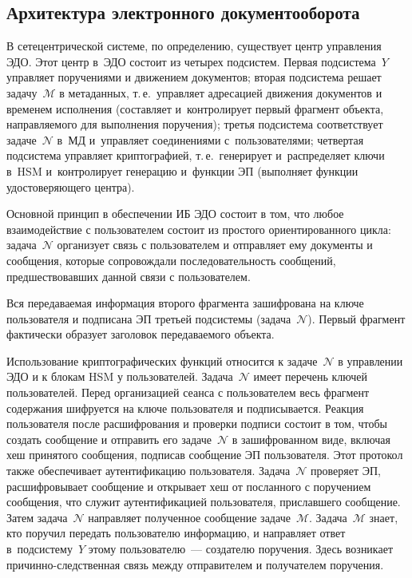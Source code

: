 \begin{multicols}{2}
\section{Архитектура электронного документооборота}

   В сетецентрической системе, по определению, существует центр управления 
ЭДО. Этот центр в~ЭДО состоит из четырех подсистем. Первая подсистема~$Y$ 
управляет поручениями и движением документов; вторая подсистема решает 
задачу~$\mathcal{M}$ в метаданных, т.\,е.\ управляет адресацией движения 
документов и временем исполнения (составляет и~контролирует первый фрагмент 
объекта, направляемого для выполнения поручения); третья под\-сис\-те\-ма 
соответствует задаче~$\mathcal{N}$ в~МД и~управ\-ля\-ет соединениями 
с~пользователями; четвертая под\-сис\-те\-ма управ\-ля\-ет криптографией, т.\,е.\ генерирует 
и~распределяет ключи в~HSM и~контролирует генерацию и~функции ЭП 
(выполняет функции удосто\-ве\-ря\-юще\-го центра). 
  
  Основной принцип в обеспечении ИБ ЭДО состоит в том, что любое 
взаимодействие с пользователем состоит из простого ориентированного цикла:
  задача~$\mathcal{N}$ организует связь с пользователем и отправляет ему 
документы и сообщения, которые сопровождали последовательность сообщений, 
предшествовавших данной связи с пользователем. 

Вся передаваемая информация 
второго фрагмента зашифрована на ключе пользователя и подписана ЭП третьей 
подсистемы (задача~$\mathcal{N}$). Первый фрагмент фактически образует 
заголовок передаваемого объекта. 
  
  Использование криптографических функций относится к задаче~$\mathcal{N}$ 
в управлении ЭДО и к блокам HSM у пользователей. Задача~$\mathcal{N}$ имеет 
перечень ключей пользователей. Перед организацией сеанса с пользователем весь 
фрагмент содержания шифруется на ключе пользователя и подписывается. 
Реакция пользователя после расшифрования и проверки подписи состоит в том, 
чтобы создать сообщение и отправить его задаче~$\mathcal{N}$ в зашифрованном 
виде, включая хеш принятого сообщения, подписав сообщение ЭП пользователя. 
Этот протокол также обеспечивает аутентификацию пользователя. 
Задача~$\mathcal{N}$ проверяет ЭП, расшифровывает сообщение и открывает 
хеш от посланного с поручением сообщения, что служит аутентификацией 
пользователя, приславшего сообщение. Затем задача~$\mathcal{N}$ направляет 
полученное сообщение задаче~$\mathcal{M}$. Задача~$\mathcal{M}$ знает, кто 
поручил передать пользователю информацию, и направляет ответ 
в~подсистему~$Y$ этому пользователю~--- создателю поручения. Здесь возникает 
причинно-следственная связь между отправителем и получателем поручения.
  

\end{multicols}
